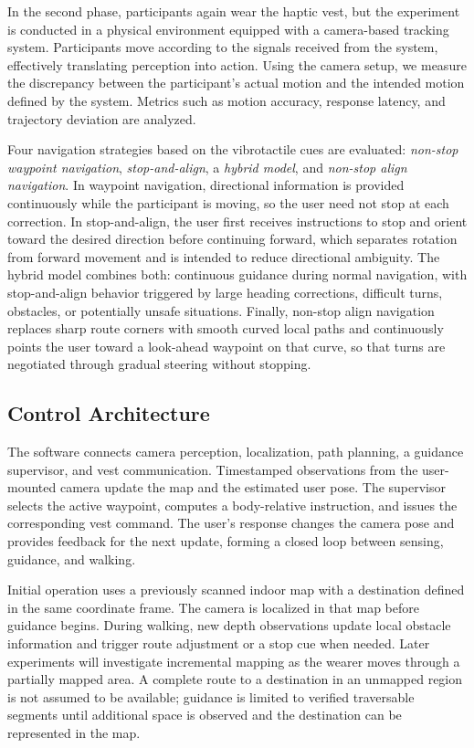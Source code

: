 \documentclass[12pt]{report}
\begin{document}
In the second phase, participants again wear the haptic vest, but the experiment is conducted in a physical environment equipped with a camera-based tracking system. Participants move according to the signals received from the system, effectively translating perception into action. Using the camera setup, we measure the discrepancy between the participant's actual motion and the intended motion defined by the system. Metrics such as motion accuracy, response latency, and trajectory deviation are analyzed.

Four navigation strategies based on the vibrotactile cues are evaluated: \textit{non-stop waypoint navigation}, \textit{stop-and-align}, a \textit{hybrid model}, and \textit{non-stop align navigation}. In waypoint navigation, directional information is provided continuously while the participant is moving, so the user need not stop at each correction. In stop-and-align, the user first receives instructions to stop and orient toward the desired direction before continuing forward, which separates rotation from forward movement and is intended to reduce directional ambiguity. The hybrid model combines both: continuous guidance during normal navigation, with stop-and-align behavior triggered by large heading corrections, difficult turns, obstacles, or potentially unsafe situations. Finally, non-stop align navigation replaces sharp route corners with smooth curved local paths and continuously points the user toward a look-ahead waypoint on that curve, so that turns are negotiated through gradual steering without stopping.

\subsection*{Control Architecture}

The software connects camera perception, localization, path planning, a guidance supervisor, and vest communication. Timestamped observations from the user-mounted camera update the map and the estimated user pose. The supervisor selects the active waypoint, computes a body-relative instruction, and issues the corresponding vest command. The user's response changes the camera pose and provides feedback for the next update, forming a closed loop between sensing, guidance, and walking.

Initial operation uses a previously scanned indoor map with a destination defined in the same coordinate frame. The camera is localized in that map before guidance begins. During walking, new depth observations update local obstacle information and trigger route adjustment or a stop cue when needed. Later experiments will investigate incremental mapping as the wearer moves through a partially mapped area. A complete route to a destination in an unmapped region is not assumed to be available; guidance is limited to verified traversable segments until additional space is observed and the destination can be represented in the map.
\end{document}
